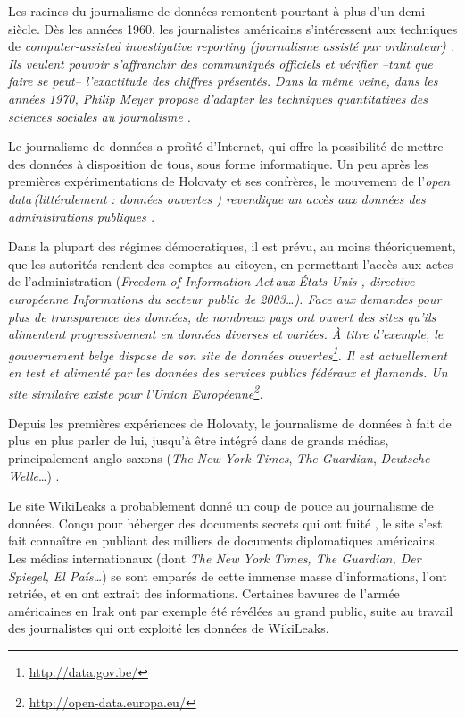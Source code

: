 Les racines du journalisme de données remontent pourtant à plus d'un demi-siècle.
Dès les années 1960, les journalistes américains s'intéressent aux techniques de
\em computer-assisted investigative reporting \em (journalisme assisté par ordinateur) 
\cite{defleur}.
Ils veulent pouvoir s'affranchir des communiqués officiels et vérifier --tant que
faire se peut-- l'exactitude des chiffres présentés. Dans la même veine, dans les
années 1970, Philip Meyer propose d'adapter les techniques quantitatives des 
sciences sociales au journalisme \cite{meyer}.

Le journalisme de données a profité d'Internet, qui offre la possibilité de
mettre des données à disposition de tous, sous forme informatique. Un peu après les 
premières expérimentations de Holovaty et ses confrères, le mouvement de 
l'\em open data\em\,(littéralement : \og données ouvertes \fg) revendique un
accès aux données des administrations publiques \cite{bradshaw}. 

Dans la plupart des régimes 
démocratiques, il est prévu, au moins théoriquement, que les autorités rendent 
des comptes au citoyen, en permettant l'accès aux actes de l'administration
(\em Freedom of Information Act\em\,aux États-Unis \cite{defleur}, directive européenne \og Informations du secteur public \fg de 2003\dots).
Face aux demandes pour plus de transparence des données, de nombreux pays ont
ouvert des sites qu'ils alimentent progressivement en données diverses et variées.
À titre d'exemple, le gouvernement belge dispose de son site de données ouvertes\footnote{\url{http://data.gov.be/}}. Il est actuellement en test et alimenté par les données des services publics fédéraux et flamands. Un site similaire existe pour l'Union Européenne\footnote{\url{http://open-data.europa.eu/}}.

Depuis les premières expériences de Holovaty, le journalisme de données à fait de plus en plus parler de lui, jusqu'à être intégré dans de grands médias, principalement anglo-saxons (\textit{The New York Times}, \textit{The Guardian}, \textit{Deutsche Welle}\dots) \cite{handbook}.

Le site WikiLeaks a probablement donné un coup de pouce au journalisme de données.
Conçu pour héberger des documents secrets qui ont \og fuité \fg, le site
s'est fait connaître en publiant des milliers de documents diplomatiques américains.
Les médias internationaux (dont \textit{The New York Times, The Guardian, Der Spiegel, El País\dots}) se sont emparés de cette immense masse d'informations, l'ont
retriée, et en ont extrait des informations. Certaines bavures de l'armée américaines
en Irak ont par exemple été révélées au grand public, suite au travail des 
journalistes qui ont exploité les données de WikiLeaks.


